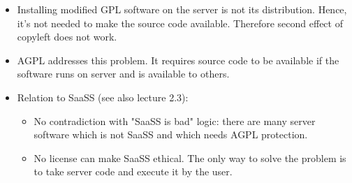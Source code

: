 \documentclass[twoside,openright]{report}
\begin{document}
\begin{itemize}
\begin{itemize}
 \item         Installing modified GPL software on the server is not its distribution. Hence, it's not needed to make the source code available. Therefore second effect of copyleft does not work.
 \item         AGPL addresses this problem. It requires source code to be available if the software runs on server and is available to others.
 \item         Relation to SaaSS (see also lecture 2.3):
\begin{itemize}
 \item             No contradiction with "SaaSS is bad" logic: there are many server software which is not SaaSS and which needs AGPL protection.
 \item             No license can make SaaSS ethical. The only way to solve the problem is to take server code and execute it by the user.
\end{itemize}
\end{itemize}
\end{itemize}
\end{document}
